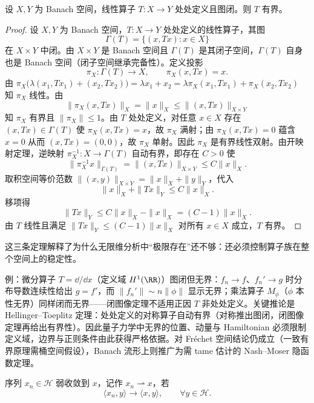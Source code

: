 \begin{proposition}[由开映射定理得到闭图定理]
设 $X,Y$ 为 Banach 空间，线性算子 $T:X\to Y$ 处处定义且图闭。则 $T$ 有界。
\end{proposition}
\begin{proof}
设 $X,Y$ 为 Banach 空间，$T:X\to Y$ 处处定义的线性算子，其图
\begin{equation*}
\Gamma(T)=\{(x,Tx):x\in X\}
\end{equation*}
在 $X\times Y$ 中闭。由 $X\times Y$ 是 Banach 空间且 $\Gamma(T)$ 是其闭子空间，$\Gamma(T)$ 自身也是 Banach 空间（闭子空间继承完备性）。定义投影
\begin{equation*}
\pi_X:\Gamma(T)\to X,
\qquad
\pi_X(x,Tx)=x.
\end{equation*}
由 $\pi_X\bigl(\lambda(x_1,Tx_1)+(x_2,Tx_2)\bigr)=\lambda x_1+x_2=\lambda\pi_X(x_1,Tx_1)+\pi_X(x_2,Tx_2)$ 知 $\pi_X$ 线性。由
\begin{equation*}
\|\pi_X(x,Tx)\|_X=\|x\|_X\le\|(x,Tx)\|_{X\times Y}
\end{equation*}
知 $\pi_X$ 有界且 $\|\pi_X\|\le1$。由 $T$ 处处定义，对任意 $x\in X$ 存在 $(x,Tx)\in\Gamma(T)$ 使 $\pi_X(x,Tx)=x$，故 $\pi_X$ 满射；由 $\pi_X(x,Tx)=0$ 蕴含 $x=0$ 从而 $(x,Tx)=(0,0)$，故 $\pi_X$ 单射。因此 $\pi_X$ 是有界线性双射。由开映射定理，逆映射 $\pi_X^{-1}:X\to\Gamma(T)$ 自动有界，即存在 $C>0$ 使
\begin{equation*}
\|\pi_X^{-1}x\|_{\Gamma(T)}
=\|(x,Tx)\|_{X\times Y}
\le C\|x\|_X.
\end{equation*}
取积空间等价范数 $\|(x,y)\|_{X\times Y}=\|x\|_X+\|y\|_Y$，代入
\begin{equation*}
\|x\|_X+\|Tx\|_Y\le C\|x\|_X.
\end{equation*}
移项得
\begin{equation*}
\|Tx\|_Y\le C\|x\|_X-\|x\|_X=(C-1)\|x\|_X.
\end{equation*}
由 $T$ 线性且满足 $\|Tx\|_Y\le(C-1)\|x\|_X$ 对所有 $x\in X$ 成立，$T$ 有界。
\end{proof}


这三条定理解释了为什么无限维分析中“极限存在”还不够：还必须控制算子族在整个空间上的稳定性。

例：微分算子 $T=\dd/\dd x$（定义域 $H^1(\RR)$）图闭但无界：$f_n\to f$、$f_n'\to g$ 时分布导数连续性给出 $g=f'$，而 $\|f_n'\|\sim n\|\phi\|$ 显示无界；乘法算子 $M_\phi$（$\phi$ 本性无界）同样闭而无界——闭图像定理不适用正因 $T$ 非处处定义。关键推论是 Hellinger--Toeplitz 定理：处处定义的对称算子自动有界（对称推出图闭，闭图像定理再给出有界性）。因此量子力学中无界的位置、动量与 Hamiltonian 必须限制定义域，边界与正则条件由此获得严格依据。对 Fr\'echet 空间结论仍成立（一致有界原理需桶空间假设），Banach 流形上则推广为需 tame 估计的 Nash--Moser 隐函数定理。
\begin{definition}[弱收敛]
序列 $x_n\in\mathcal H$ 弱收敛到 $x$，记作 $x_n\rightharpoonup x$，若
\[
\langle x_n,y\rangle\to\langle x,y\rangle,
\qquad \forall y\in\mathcal H.
\]
\end{definition}

